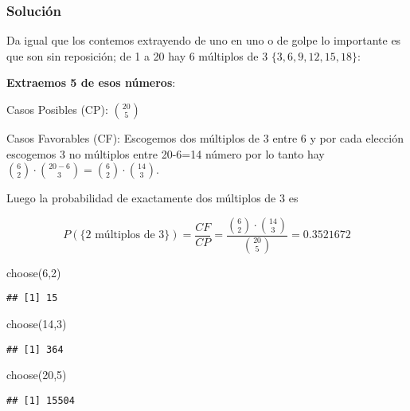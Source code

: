 \documentclass[
]{article}
\newenvironment{Shaded}{\begin{snugshade}}{\end{snugshade}}
\newcommand{\DecValTok}[1]{\textcolor[rgb]{0.00,0.00,0.81}{#1}}
\newcommand{\FunctionTok}[1]{\textcolor[rgb]{0.00,0.00,0.00}{#1}}
\newcommand{\NormalTok}[1]{#1}
\begin{document}
\hypertarget{soluciuxf3n-13}{%
\subsubsection{Solución}\label{soluciuxf3n-13}}

Da igual que los contemos extrayendo de uno en uno o de golpe lo
importante es que son sin reposición; de 1 a 20 hay 6 múltiplos de 3
\(\{3,6,9,12,15,18\}\):

\textbf{Extraemos 5 de esos números}:

Casos Posibles (CP): \({20 \choose 5}\)

Casos Favorables (CF): Escogemos dos múltiplos de 3 entre 6 y por cada
elección escogemos 3 no múltiplos entre 20-6=14 número por lo tanto hay
\({6 \choose 2}\cdot{{20-6} \choose 3}={6 \choose 2}\cdot{{14} \choose 3}\).

Luego la probabilidad de exactamente dos múltiplos de 3 es

\[
P(\mbox{\{2 múltiplos de 3\}} )=\frac{CF}{CP}=\frac{{6 \choose 2}\cdot{14 \choose 3}}{{20 \choose 5}}=0.3521672
\]

\begin{Shaded}
\begin{Highlighting}[]
\FunctionTok{choose}\NormalTok{(}\DecValTok{6}\NormalTok{,}\DecValTok{2}\NormalTok{)}
\end{Highlighting}
\end{Shaded}

\begin{verbatim}
## [1] 15
\end{verbatim}

\begin{Shaded}
\begin{Highlighting}[]
\FunctionTok{choose}\NormalTok{(}\DecValTok{14}\NormalTok{,}\DecValTok{3}\NormalTok{)}
\end{Highlighting}
\end{Shaded}

\begin{verbatim}
## [1] 364
\end{verbatim}

\begin{Shaded}
\begin{Highlighting}[]
\FunctionTok{choose}\NormalTok{(}\DecValTok{20}\NormalTok{,}\DecValTok{5}\NormalTok{)}
\end{Highlighting}
\end{Shaded}

\begin{verbatim}
## [1] 15504
\end{verbatim}
\end{document}
